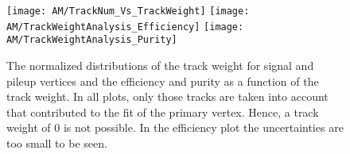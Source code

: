 \begin{figure}[!ht]
    \centering
    \texttt{[image: AM/TrackNum\_Vs\_TrackWeight]}
    \texttt{[image: AM/TrackWeightAnalysis\_Efficiency]}
    \texttt{[image: AM/TrackWeightAnalysis\_Purity]}
    \caption[Distribution of the track weight and efficiency and purity vs track weight]{The normalized distributions of the track weight for signal and pileup vertices and the efficiency and purity as a function of the track weight. In all plots, only those tracks are taken into account that contributed to the fit of the primary vertex. Hence, a track weight of 0 is not possible. In the efficiency plot the uncertainties are too small to be seen.  \label{plot:AMTWdistpureff}}
\end{figure}

